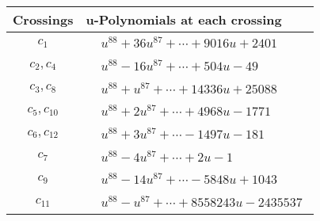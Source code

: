 \documentclass[1p]{elsarticle_modified}
\theoremstyle{definition}
\begin{document}
\begin{tabular}{m{50pt}|m{274pt}}
Crossings & \hspace{64pt}u-Polynomials at each crossing \\
\hline $$\begin{aligned}c_{1}\end{aligned}$$&$\begin{aligned}
&u^{88}+36 u^{87}+\cdots+9016 u+2401
\end{aligned}$\\
\hline $$\begin{aligned}c_{2},c_{4}\end{aligned}$$&$\begin{aligned}
&u^{88}-16 u^{87}+\cdots+504 u-49
\end{aligned}$\\
\hline $$\begin{aligned}c_{3},c_{8}\end{aligned}$$&$\begin{aligned}
&u^{88}+u^{87}+\cdots+14336 u+25088
\end{aligned}$\\
\hline $$\begin{aligned}c_{5},c_{10}\end{aligned}$$&$\begin{aligned}
&u^{88}+2 u^{87}+\cdots+4968 u-1771
\end{aligned}$\\
\hline $$\begin{aligned}c_{6},c_{12}\end{aligned}$$&$\begin{aligned}
&u^{88}+3 u^{87}+\cdots-1497 u-181
\end{aligned}$\\
\hline $$\begin{aligned}c_{7}\end{aligned}$$&$\begin{aligned}
&u^{88}-4 u^{87}+\cdots+2 u-1
\end{aligned}$\\
\hline $$\begin{aligned}c_{9}\end{aligned}$$&$\begin{aligned}
&u^{88}-14 u^{87}+\cdots-5848 u+1043
\end{aligned}$\\
\hline $$\begin{aligned}c_{11}\end{aligned}$$&$\begin{aligned}
&u^{88}- u^{87}+\cdots+8558243 u-2435537
\end{aligned}$\\
\hline
\end{tabular}\\~\\
\end{document}
